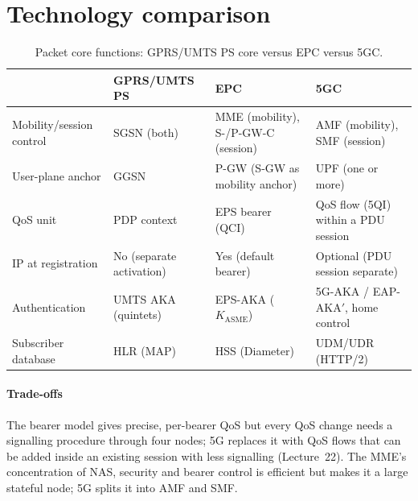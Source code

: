 \documentclass[11pt,a4paper]{article}
\begin{document}
\section{Technology comparison}
\begin{table}[htbp]
\centering\small
\caption{Packet core functions: GPRS/UMTS PS core versus EPC versus 5GC.}\label{tab:core}
\begin{tabularx}{\linewidth}{@{}l Y Y Y@{}}
\toprule
{} & GPRS/UMTS PS & EPC & 5GC \\
\midrule
Mobility/session control & SGSN (both)            & MME (mobility), S-/P-GW-C (session) & AMF (mobility), SMF (session) \\
User-plane anchor        & GGSN                   & P-GW (S-GW as mobility anchor)      & UPF (one or more) \\
QoS unit                 & PDP context            & EPS bearer (QCI)                    & QoS flow (5QI) within a PDU session \\
IP at registration       & No (separate activation) & Yes (default bearer)             & Optional (PDU session separate) \\
Authentication           & UMTS AKA (quintets)    & EPS-AKA ($K_{\mathrm{ASME}}$)       & 5G-AKA / EAP-AKA$'$, home control \\
Subscriber database      & HLR (MAP)              & HSS (Diameter)                      & UDM/UDR (HTTP/2) \\
\bottomrule
\end{tabularx}
\end{table}

\paragraph{Trade-offs} The bearer model gives precise, per-bearer QoS but every QoS change needs a
signalling procedure through four nodes; 5G replaces it with QoS flows that can be added inside an
existing session with less signalling (Lecture~22). The MME's concentration of NAS, security and
bearer control is efficient but makes it a large stateful node; 5G splits it into AMF and SMF.

\end{document}

